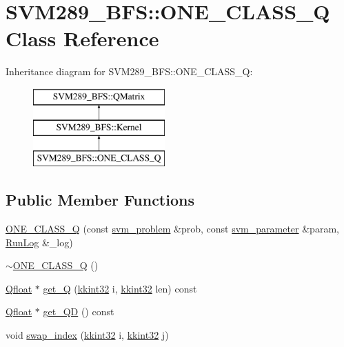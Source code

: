 \hypertarget{class_s_v_m289___b_f_s_1_1_o_n_e___c_l_a_s_s___q}{}\section{S\+V\+M289\+\_\+\+B\+FS\+:\+:O\+N\+E\+\_\+\+C\+L\+A\+S\+S\+\_\+Q Class Reference}
\label{class_s_v_m289___b_f_s_1_1_o_n_e___c_l_a_s_s___q}
Inheritance diagram for S\+V\+M289\+\_\+\+B\+FS\+:\+:O\+N\+E\+\_\+\+C\+L\+A\+S\+S\+\_\+Q\+:\begin{figure}[H]
\begin{center}
\leavevmode
\includegraphics[height=3.000000cm]{class_s_v_m289___b_f_s_1_1_o_n_e___c_l_a_s_s___q}
\end{center}
\end{figure}
\subsection*{Public Member Functions}
\begin{DoxyCompactItemize}
\item 
\hyperlink{class_s_v_m289___b_f_s_1_1_o_n_e___c_l_a_s_s___q_a6423a083c0775e6f9667c67f4a9f84d0}{O\+N\+E\+\_\+\+C\+L\+A\+S\+S\+\_\+Q} (const \hyperlink{struct_s_v_m289___b_f_s_1_1svm__problem}{svm\+\_\+problem} \&prob, const \hyperlink{struct_s_v_m289___b_f_s_1_1svm__parameter}{svm\+\_\+parameter} \&param, \hyperlink{class_k_k_b_1_1_run_log}{Run\+Log} \&\+\_\+log)
\item 
\hyperlink{class_s_v_m289___b_f_s_1_1_o_n_e___c_l_a_s_s___q_a7bd375fbead11a3e79a192743460a69d}{$\sim$\+O\+N\+E\+\_\+\+C\+L\+A\+S\+S\+\_\+Q} ()
\item 
\hyperlink{namespace_s_v_m289___b_f_s_a8b0a7657dcefcb6e9a857c9b5e2fd2ef}{Qfloat} $\ast$ \hyperlink{class_s_v_m289___b_f_s_1_1_o_n_e___c_l_a_s_s___q_a90163690e3398fa8335db5564cb0f669}{get\+\_\+Q} (\hyperlink{namespace_k_k_b_a8fa4952cc84fda1de4bec1fbdd8d5b1b}{kkint32} i, \hyperlink{namespace_k_k_b_a8fa4952cc84fda1de4bec1fbdd8d5b1b}{kkint32} len) const 
\item 
\hyperlink{namespace_s_v_m289___b_f_s_a8b0a7657dcefcb6e9a857c9b5e2fd2ef}{Qfloat} $\ast$ \hyperlink{class_s_v_m289___b_f_s_1_1_o_n_e___c_l_a_s_s___q_a25c2adac12d6acb87decfb7db56a27a6}{get\+\_\+\+QD} () const 
\item 
void \hyperlink{class_s_v_m289___b_f_s_1_1_o_n_e___c_l_a_s_s___q_ab35df03535908bed2a005d9bbf6d427a}{swap\+\_\+index} (\hyperlink{namespace_k_k_b_a8fa4952cc84fda1de4bec1fbdd8d5b1b}{kkint32} i, \hyperlink{namespace_k_k_b_a8fa4952cc84fda1de4bec1fbdd8d5b1b}{kkint32} j)
\end{DoxyCompactItemize}
